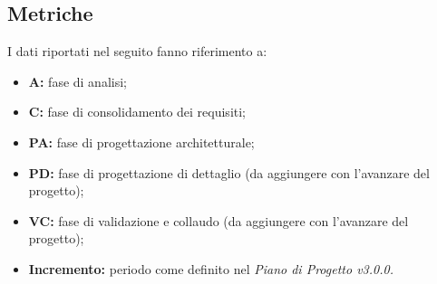 \subsection{Metriche}
I dati riportati nel seguito fanno riferimento a:
\begin{itemize}
    \item \textbf{A:} fase di analisi;
    \item \textbf{C:} fase di consolidamento dei requisiti;
    \item \textbf{PA:} fase di progettazione architetturale;
    \item \textbf{PD:} fase di progettazione di dettaglio (da aggiungere con l'avanzare del progetto);
    \item \textbf{VC:} fase di validazione e collaudo (da aggiungere con l'avanzare del progetto);
    \item \textbf{Incremento:} periodo come definito nel \textit{Piano di Progetto v3.0.0.}
\end{itemize}
